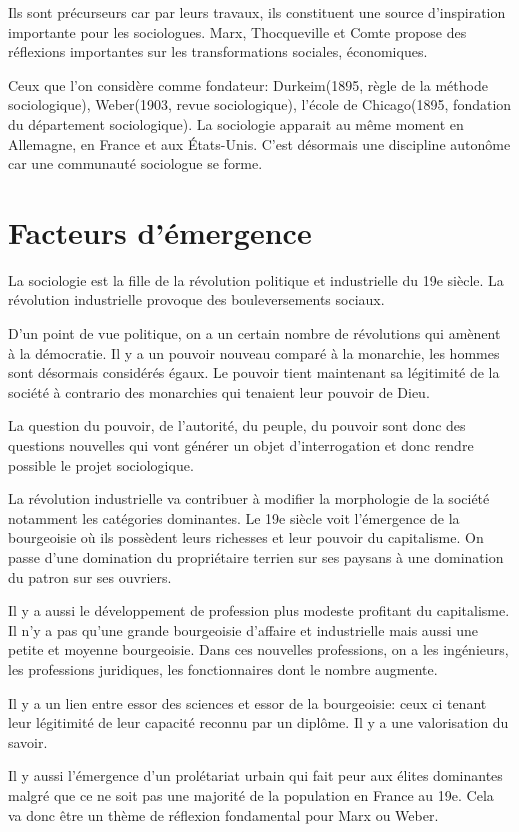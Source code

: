 ﻿\documentclass[12pt, a4paper, openany]{book}
\begin{document}
Ils sont précurseurs car par leurs travaux, ils constituent une source d'inspiration importante pour les sociologues. Marx, Thocqueville et Comte propose des réflexions importantes sur les transformations sociales, économiques.

Ceux que l'on considère comme fondateur: Durkeim(1895, règle de la méthode sociologique), Weber(1903, revue sociologique), l'école de Chicago(1895, fondation du département sociologique). La sociologie apparait au même moment en Allemagne, en France et aux États-Unis. C'est désormais une discipline autonôme car une communauté sociologue se forme.

\section{Facteurs d'émergence}

La sociologie est la fille de la révolution politique et industrielle du 19e siècle. La révolution industrielle provoque des bouleversements sociaux.

D'un point de vue politique, on a un certain nombre de révolutions qui amènent à la démocratie. Il y a un pouvoir nouveau comparé à la monarchie, les hommes sont désormais considérés égaux. Le pouvoir tient maintenant sa légitimité de la société à contrario des monarchies qui tenaient leur pouvoir de Dieu.

La question du pouvoir, de l'autorité, du peuple, du pouvoir sont donc des questions nouvelles qui vont générer un objet d'interrogation et donc rendre possible le projet sociologique.

La révolution industrielle va contribuer à modifier la morphologie de la société notamment les catégories dominantes. Le 19e siècle voit l'émergence de la bourgeoisie où ils possèdent leurs richesses et leur pouvoir du capitalisme. On passe d'une domination du propriétaire terrien sur ses paysans à une domination du patron sur ses ouvriers. 

Il y a aussi le développement de profession plus modeste profitant du capitalisme. Il n'y a pas qu'une grande bourgeoisie d'affaire et industrielle mais aussi une petite et moyenne bourgeoisie. Dans ces nouvelles professions, on a les ingénieurs, les professions juridiques, les fonctionnaires dont le nombre augmente.

Il y a un lien entre essor des sciences et essor de la bourgeoisie: ceux ci tenant leur légitimité de leur capacité reconnu par un diplôme. Il y a une valorisation du savoir.

Il y aussi l'émergence d'un prolétariat urbain qui fait peur aux élites dominantes malgré que ce ne soit pas une majorité de la population en France au 19e. Cela va donc être un thème de réflexion fondamental pour Marx ou Weber. 
\end{document}
